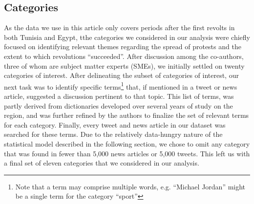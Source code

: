 \subsection{Categories}

As the data we use in this article only covers periods after the first revolts in both Tunisia and Egypt, tthe categories we considered in our analysis were chiefly focused on identifying relevant themes regarding the spread of protests and the extent to which revolutions ``succeeded''. After discussion among the co-authors, three of whom are subject matter experts (SMEs), we initially settled on twenty categories of interest. After delineating the subset of categories of interest, our next task was to identify specific terms\footnote{Note that a term may comprise multiple words, e.g. ``Michael Jordan'' might be a single term for the category ``sport''} that, if mentioned in a tweet or news article, suggested a discussion pertinent to that topic. This list of terms, was partly derived from dictionaries developed over several years of study on the region, and was further refined by the authors to finalize the set of relevant terms for each category. Finally, every tweet and news article in our dataset was searched for these terms. Due to the relatively data-hungry nature of the statistical model described in the following section, we chose to omit any category that was found in fewer than 5,000 news articles or 5,000 tweets.  This left us with a final set of eleven categories that we considered in our analysis.

